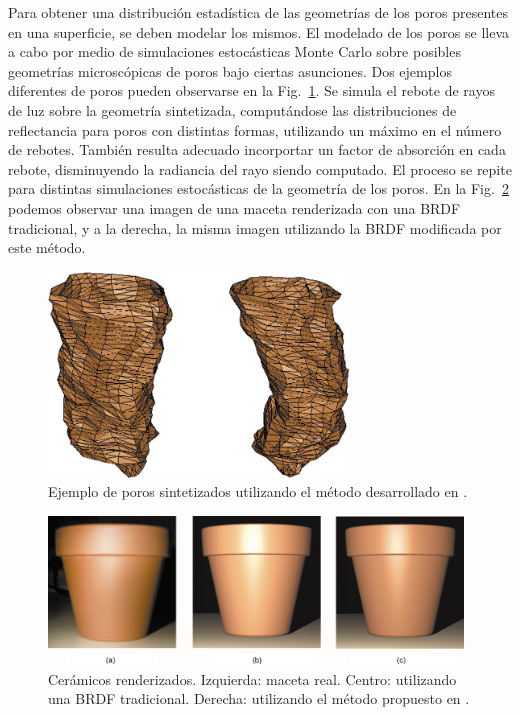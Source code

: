 Para obtener una distribución estadística de las geometrías de los poros presentes en una superficie, se deben modelar los mismos.
El modelado de los poros se lleva a cabo por medio de simulaciones estocásticas Monte Carlo sobre posibles geometrías microscópicas de poros bajo ciertas asunciones.
Dos ejemplos diferentes de poros pueden observarse en la Fig.~\ref{fg:poro}.
Se simula el rebote de rayos de luz sobre la geometría sintetizada, computándose las distribuciones de reflectancia para poros con distintas formas, utilizando un máximo en el número de rebotes.
También resulta adecuado incorportar un factor de absorción en cada rebote, disminuyendo la radiancia del rayo siendo computado.
El proceso se repite para distintas simulaciones estocásticas de la geometría de los poros.
En la Fig.~\ref{fg:ceramico} podemos observar una imagen de una maceta renderizada con una BRDF tradicional, y a la derecha, la misma imagen utilizando la BRDF modificada por este método.

\begin{figure}
\center
\includegraphics[width=8cm]{figures/poro}
\caption[Poros sinterizados]{Ejemplo de poros sintetizados utilizando el método desarrollado en \cite{Merillou2000}.}
\label{fg:poro}
\end{figure}

\begin{figure}
\center
\includegraphics[width=11cm]{figures/ceramico}
\caption[Cerámicos renderizados]{Cerámicos renderizados. Izquierda: maceta real. Centro: utilizando una BRDF tradicional. Derecha: utilizando el método propuesto en \cite{Merillou2000}.}
\label{fg:ceramico}
\end{figure}

